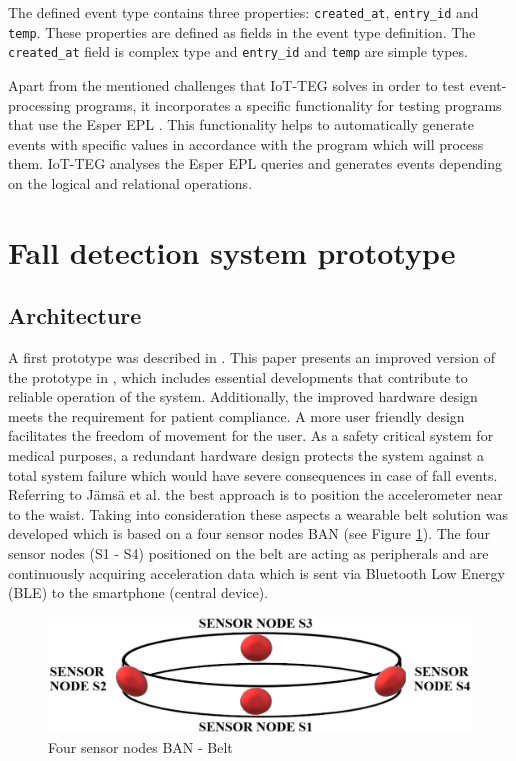 \documentclass[10pt,journal,compsoc]{IEEEtran}
\begin{document}
The defined event type contains three properties: \texttt{created\_at},
\texttt{entry\_id} and \texttt{temp}. These properties are defined as
fields in the event type definition. The \texttt{created\_at} field is complex
type and \texttt{entry\_id} and \texttt{temp} are simple types. 

Apart from the mentioned challenges that IoT-TEG solves in order to test 
event-processing programs, it incorporates a specific functionality
for testing programs that use the Esper EPL \cite{Esper:2016}. 
This functionality helps to 
automatically generate events with specific values in accordance with the 
program which will process them. IoT-TEG analyses the Esper EPL queries and 
generates events depending on the logical and relational operations. 


\section{Fall detection system prototype}
\label{sec:fall-detectionPrototype}	

\subsection{Architecture}
\label{subsec:Architecture}	
 A first prototype was described in \cite{LaBlunda.2016, LaBlunda.2016b}. This paper presents an improved version of the prototype in \cite{LaBlunda.2016, LaBlunda.2016b}, which includes essential developments that contribute to reliable operation of the system. Additionally, the improved hardware design meets the requirement for patient compliance. A more user friendly design facilitates the freedom of movement for the user. As a safety critical system for medical purposes, a redundant hardware design protects the system against a total system failure which would have severe consequences in case of fall events. Referring to J{\"a}ms{\"a} et al. \cite{jamsa2014fall} the best approach is to position the accelerometer near to the waist. Taking into consideration these aspects a wearable belt solution was developed which is based on a four sensor nodes BAN (see Figure \ref{fig:BanBelt}). The four sensor nodes (S1 - S4) positioned on the belt are acting as peripherals and are continuously acquiring acceleration data which is sent via Bluetooth Low Energy (BLE) to the smartphone (central device). 
\begin{figure}[!ht]
	\centering
	\includegraphics[scale=0.27]{Images/belt.eps}
	\caption[Four sensor nodes BAN - Belt]{Four sensor nodes BAN - Belt \cite{LaBlunda.2016, LaBlunda.2016b}}
	\label{fig:BanBelt}
\end{figure}
\end{document}
